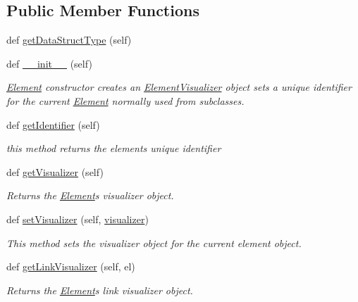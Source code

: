 \subsection*{Public Member Functions}
\begin{DoxyCompactItemize}
\item 
def \hyperlink{class_element_1_1_element_ad731077bce6c6caede6bdb6609672f68}{get\+Data\+Struct\+Type} (self)
\item 
def \hyperlink{class_element_1_1_element_a977b7da08b2c2ffb8d2f0c90e1fee284}{\+\_\+\+\_\+init\+\_\+\+\_\+} (self)
\begin{DoxyCompactList}\small\item\em \hyperlink{class_element_1_1_element}{Element} constructor creates an \hyperlink{namespace_element_visualizer}{Element\+Visualizer} object sets a unique identifier for the current \hyperlink{class_element_1_1_element}{Element} normally used from subclasses. \end{DoxyCompactList}\item 
def \hyperlink{class_element_1_1_element_aac5918af79bb6bd95cf429d1a219901e}{get\+Identifier} (self)
\begin{DoxyCompactList}\small\item\em this method returns the element\textquotesingle{}s unique identifier \end{DoxyCompactList}\item 
def \hyperlink{class_element_1_1_element_a83844b6ce0a822dfb09b4cdd16691ac5}{get\+Visualizer} (self)
\begin{DoxyCompactList}\small\item\em Returns the \hyperlink{class_element_1_1_element}{Element}\textquotesingle{}s visualizer object. \end{DoxyCompactList}\item 
def \hyperlink{class_element_1_1_element_a79f1e429c47e65341273e9971ff1ece0}{set\+Visualizer} (self, \hyperlink{class_element_1_1_element_a7a5b8e1891bf065fa81f51a8f6b4212e}{visualizer})
\begin{DoxyCompactList}\small\item\em This method sets the visualizer object for the current element object. \end{DoxyCompactList}\item 
def \hyperlink{class_element_1_1_element_aad4a71d78f6c60de5bf871fd7632d720}{get\+Link\+Visualizer} (self, el)
\begin{DoxyCompactList}\small\item\em Returns the \hyperlink{class_element_1_1_element}{Element}\textquotesingle{}s link visualizer object. \end{DoxyCompactList}\item 

\end{DoxyCompactItemize}
